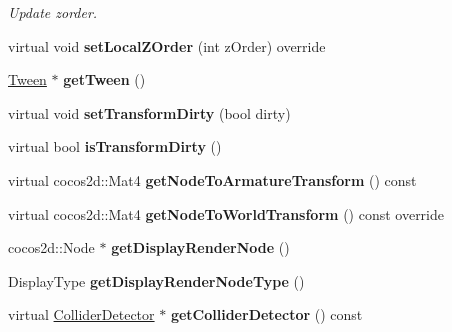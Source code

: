 \begin{DoxyCompactItemize}
\begin{DoxyCompactList}\small\item\em Update zorder. \end{DoxyCompactList}\item 
\mbox{\label{classcocostudio_1_1Bone_a98af64ce84be34a90e43205f2c219ac0}} 
virtual void {\bfseries set\+Local\+Z\+Order} (int z\+Order) override
\item 
\mbox{\label{classcocostudio_1_1Bone_a50e9835d978461dce4a74602bfc0d12d}} 
\hyperlink{classcocostudio_1_1Tween}{Tween} $\ast$ {\bfseries get\+Tween} ()
\item 
\mbox{\label{classcocostudio_1_1Bone_af52312eda5095ca8610de3776136b3a4}} 
virtual void {\bfseries set\+Transform\+Dirty} (bool dirty)
\item 
\mbox{\label{classcocostudio_1_1Bone_a14fe8e71a1d9145d93fd7b246f34c71d}} 
virtual bool {\bfseries is\+Transform\+Dirty} ()
\item 
\mbox{\label{classcocostudio_1_1Bone_a5960c674bfa2bda8d43f5ee2b22ba449}} 
virtual cocos2d\+::\+Mat4 {\bfseries get\+Node\+To\+Armature\+Transform} () const
\item 
\mbox{\label{classcocostudio_1_1Bone_a41eb4988552e84465fa4ec1ff3f7a5ca}} 
virtual cocos2d\+::\+Mat4 {\bfseries get\+Node\+To\+World\+Transform} () const override
\item 
\mbox{\label{classcocostudio_1_1Bone_a3554bb4dc465f2960a9b6297d332a58d}} 
cocos2d\+::\+Node $\ast$ {\bfseries get\+Display\+Render\+Node} ()
\item 
\mbox{\label{classcocostudio_1_1Bone_a18dc647785590600cf5fb77ec19cc7a9}} 
Display\+Type {\bfseries get\+Display\+Render\+Node\+Type} ()
\item 
\mbox{\label{classcocostudio_1_1Bone_a676212a5a2b9c9cdb51d6a8138b55beb}} 
virtual \hyperlink{classcocostudio_1_1ColliderDetector}{Collider\+Detector} $\ast$ {\bfseries get\+Collider\+Detector} () const

\end{DoxyCompactItemize}
